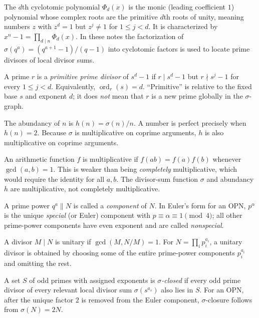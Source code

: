 \documentclass[11pt]{article}
\theoremstyle{definition}
\theoremstyle{remark}
\DeclareMathOperator{\ord}{ord}
\begin{document}
\begin{description}[style=nextline,leftmargin=1.5em]
\item[Cyclotomic polynomial.]
The $d$th cyclotomic polynomial $\Phi_d(x)$ is the monic (leading
coefficient $1$) polynomial whose complex roots are the primitive $d$th roots
of unity, meaning numbers $z$ with $z^d=1$ but $z^j\ne1$ for
$1\le j<d$.  It is characterized by
$x^n-1=\prod_{d\mid n}\Phi_d(x)$.  In these notes the factorization of
$\sigma(q^a)=(q^{a+1}-1)/(q-1)$ into cyclotomic factors is used to locate
prime divisors of local divisor sums.

\item[Primitive prime divisor.]
A prime $r$ is a \emph{primitive prime divisor} of $s^d-1$ if
$r\mid s^d-1$ but $r\nmid s^j-1$ for every $1\le j<d$.  Equivalently,
$\ord_r(s)=d$.  ``Primitive'' is relative to the fixed base $s$ and exponent
$d$; it does \emph{not} mean that $r$ is a new prime globally in the
$\sigma$-graph.

\item[Abundancy.]
The abundancy of $n$ is $h(n)=\sigma(n)/n$.  A number is perfect precisely
when $h(n)=2$.  Because $\sigma$ is multiplicative on coprime arguments,
$h$ is also multiplicative on coprime arguments.

\item[Multiplicative arithmetic function.]
An arithmetic function $f$ is multiplicative if
$f(ab)=f(a)f(b)$ whenever $\gcd(a,b)=1$.  This is weaker than being
\emph{completely} multiplicative, which would require the identity for all
$a,b$.  The divisor-sum function $\sigma$ and abundancy $h$ are
multiplicative, not completely multiplicative.

\item[Component and special component.]
A prime power $q^a\parallel N$ is called a \emph{component} of $N$.  In
Euler's form for an OPN, $p^\alpha$ is the unique \emph{special} (or Euler)
component with $p\equiv\alpha\equiv1\pmod4$; all other prime-power components
have even exponent and are called \emph{nonspecial}.

\item[Unitary divisor.]
A divisor $M\mid N$ is unitary if $\gcd(M,N/M)=1$.  For
$N=\prod_i p_i^{a_i}$, a unitary divisor is obtained by choosing some of the
entire prime-power components $p_i^{a_i}$ and omitting the rest.

\item[$\sigma$-closure.]
A set $S$ of odd primes with assigned exponents is \emph{$\sigma$-closed} if
every odd prime divisor of every relevant local divisor sum
$\sigma(s^{a_s})$ also lies in $S$.  For an OPN, after the unique factor $2$
is removed from the Euler component, $\sigma$-closure follows from
$\sigma(N)=2N$.


\end{description}
\end{document}
